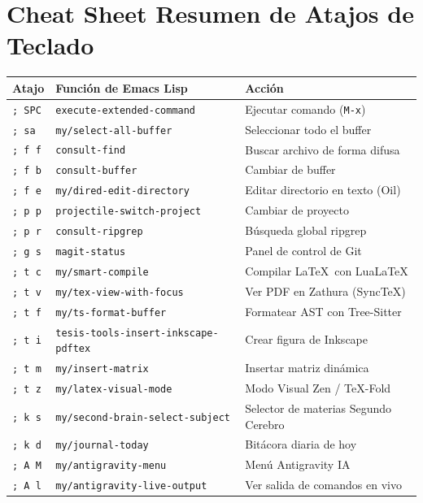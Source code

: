 \documentclass[11pt,book,spanish,alphabetic]{apuntes-scr}
\begin{document}
\chapter{Cheat Sheet Resumen de Atajos de Teclado}

\begin{center}
\small
\begin{tabularx}{\linewidth}{p{2.0cm} p{4.2cm} X}
\toprule
\textbf{Atajo} & \textbf{Función de Emacs Lisp} & \textbf{Acción} \\
\midrule
\texttt{; SPC} & \texttt{execute-extended-command} & Ejecutar comando (\texttt{M-x}) \\
\texttt{; sa}  & \texttt{my/select-all-buffer} & Seleccionar todo el buffer \\
\texttt{; f f} & \texttt{consult-find} & Buscar archivo de forma difusa \\
\texttt{; f b} & \texttt{consult-buffer} & Cambiar de buffer \\
\texttt{; f e} & \texttt{my/dired-edit-directory} & Editar directorio en texto (Oil) \\
\texttt{; p p} & \texttt{projectile-switch-project} & Cambiar de proyecto \\
\texttt{; p r} & \texttt{consult-ripgrep} & Búsqueda global ripgrep \\
\texttt{; g s} & \texttt{magit-status} & Panel de control de Git \\
\texttt{; t c} & \texttt{my/smart-compile} & Compilar \LaTeX\ con Lua\LaTeX \\
\texttt{; t v} & \texttt{my/tex-view-with-focus} & Ver PDF en Zathura (SyncTeX) \\
\texttt{; t f} & \texttt{my/ts-format-buffer} & Formatear AST con Tree-Sitter \\
\texttt{; t i} & \texttt{tesis-tools-insert-inkscape-pdftex} & Crear figura de Inkscape \\
\texttt{; t m} & \texttt{my/insert-matrix} & Insertar matriz dinámica \\
\texttt{; t z} & \texttt{my/latex-visual-mode} & Modo Visual Zen / TeX-Fold \\
\texttt{; k s} & \texttt{my/second-brain-select-subject} & Selector de materias Segundo Cerebro \\
\texttt{; k d} & \texttt{my/journal-today} & Bitácora diaria de hoy \\
\texttt{; A M} & \texttt{my/antigravity-menu} & Menú Antigravity IA \\
\texttt{; A l} & \texttt{my/antigravity-live-output} & Ver salida de comandos en vivo \\

\end{tabularx}
\end{center}
\end{document}
